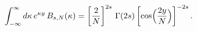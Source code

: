 \begin{equation}
\int_{-\infty}^{\infty}d\kappa\,e^{\kappa y}\,B_{s,N}(\kappa)
=\left[\frac{2}{N}\right]^{2s}\,\Gamma(2s)
\left[\cos\Bigl(\frac{2y}{N}\Bigr)\right]^{-2s}.
\label{ABs}
\end{equation}


